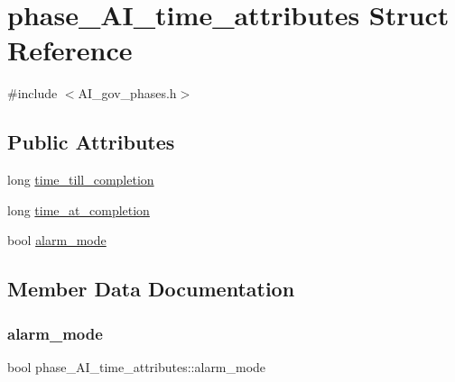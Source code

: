 \hypertarget{structphase__AI__time__attributes}{}\section{phase\+\_\+\+A\+I\+\_\+time\+\_\+attributes Struct Reference}
\label{structphase__AI__time__attributes}


{\ttfamily \#include $<$A\+I\+\_\+gov\+\_\+phases.\+h$>$}

\subsection*{Public Attributes}
\begin{DoxyCompactItemize}
\item 
long \hyperlink{structphase__AI__time__attributes_acab81a528eec61df42a542d70ea8fabb}{time\+\_\+till\+\_\+completion}
\item 
long \hyperlink{structphase__AI__time__attributes_a6cceb788e34974005d150701d5f3771e}{time\+\_\+at\+\_\+completion}
\item 
bool \hyperlink{structphase__AI__time__attributes_a68d606714d125d9fe772852dfa49fa15}{alarm\+\_\+mode}
\end{DoxyCompactItemize}


\subsection{Member Data Documentation}
\mbox{\label{structphase__AI__time__attributes_a68d606714d125d9fe772852dfa49fa15}} 
\subsubsection{\texorpdfstring{alarm\+\_\+mode}{alarm\_mode}}
{\footnotesize\ttfamily bool phase\+\_\+\+A\+I\+\_\+time\+\_\+attributes\+::alarm\+\_\+mode}

\mbox{\label{structphase__AI__time__attributes_a6cceb788e34974005d150701d5f3771e}} 
